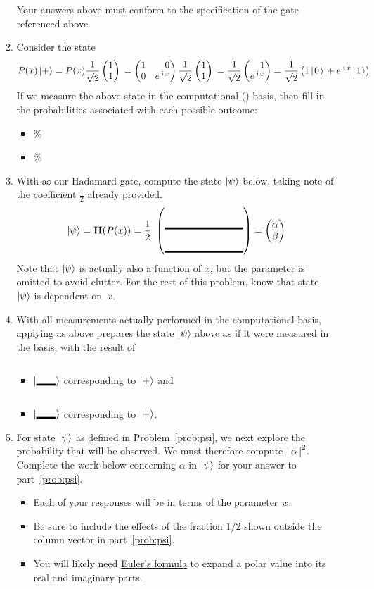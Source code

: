 \documentclass[12pt]{article}
\begin{document}
\begin{enumerate}
\begin{enumerate}[label=\theenumi.\arabic*]
\[  \]
  Your answers above must conform to the specification of the  gate referenced above.
  \item Consider the state \[
  P(x)\ket{+} = P(x)\PPlus{}= \SQBG{\relax}{1}{0}{0}{\ExpPhase{x}}\PPlus{} =\RootTwo{}\SQB{1}{\ExpPhase{x}} = \TwoSupOp{1\QZero{}}{\ExpPhase{x}\QOne}{+}
  \]
  If we measure the above state in the computational (\PauliZ{}) basis, then fill in the probabilities associated with each possible outcome:
  \begin{itemize}
      \item \QZero{} \Blank{}\%
      \item \QOne{} \Blank{}\%
  \end{itemize}
  \item\label{prob:psi} With \Hadamard{} as our Hadamard gate, compute the state $\ket{\psi}$ below, taking note of the coefficient $\frac{1}{2}$ already provided.
  \[
  \ket{\psi} = \Hadamard(P(x)) = \frac{1}{2}\ \SQB{\Blank[8em]}{\Blank[8em]} = \SQB{\alpha}{\beta}
  \]
  Note that $\ket{\psi}$ is actually also a function of $x$, but the parameter is omitted to avoid clutter.  For the rest of this problem, know that state~$\ket{\psi}$ is dependent on~$x$.
  \item With all measurements actually performed in the computational basis, applying \Hadamard{} as above prepares the state $\ket{\psi}$ above as if it were measured in the \Blank[2em]{} basis, with the result of \begin{itemize}
      \item $\ket{\Blank[2em]}$ corresponding to $\ket{+}$ and 
      \item $\ket{\Blank[2em]}$  corresponding to $\ket{-}$.
   \end{itemize}
  \item For state $\ket{\psi}$ as defined in Problem~\ref{prob:psi}, we next explore the probability that \QZero{} will be observed. We must therefore compute ${{|\,\alpha\,|}}^{2}$. Complete the work below concerning $\alpha$ in $\ket{\psi}$ for your answer to part~\ref{prob:psi}.  
  \begin{itemize} 
  \item Each of your responses will be in terms of the parameter~$x$.
  \item Be sure to include the effects of the fraction $1/2$ shown outside the column vector in part~\ref{prob:psi}.
  
  
  \item You will likely need \href{https://en.wikipedia.org/wiki/Euler%27s_formula}{Euler's formula} to expand a polar value into its real and imaginary parts. 
  \end{itemize}
  

\end{enumerate}
\end{enumerate}
\end{document}
